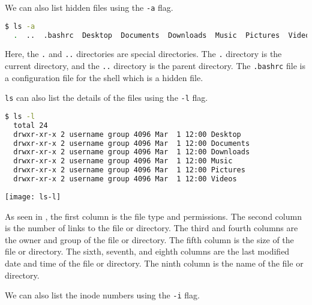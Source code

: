 We can also list hidden files
using the \lstinline|-a| flag.

\begin{lstlisting}[language=bash]
  $ ls -a
  .  ..  .bashrc  Desktop  Documents  Downloads  Music  Pictures  Videos
\end{lstlisting}

Here, the \lstinline|.| and \lstinline|..| directories are special directories. The \lstinline|.| directory is the current directory, and the \lstinline|..| directory is the parent directory.
The \lstinline|.bashrc| file is a configuration file for the shell which is a hidden file.

\lstinline|ls| can also list the details of the files using the \lstinline|-l| flag.

\begin{lstlisting}[language=bash]
  $ ls -l
  total 24
  drwxr-xr-x 2 username group 4096 Mar  1 12:00 Desktop
  drwxr-xr-x 2 username group 4096 Mar  1 12:00 Documents
  drwxr-xr-x 2 username group 4096 Mar  1 12:00 Downloads
  drwxr-xr-x 2 username group 4096 Mar  1 12:00 Music
  drwxr-xr-x 2 username group 4096 Mar  1 12:00 Pictures
  drwxr-xr-x 2 username group 4096 Mar  1 12:00 Videos
\end{lstlisting}

\begin{marginfigure}
	\texttt{[image: ls-l]}
	\caption[\lstinline|ls -l| Output]{\lstinline|ls -l| Output}
\end{marginfigure}

As seen in , the first column is the file type and permissions.
The second column is the number of links to the file or directory.
The third and fourth columns are the owner and group of the file or directory.
The fifth column is the size of the file or directory.
The sixth, seventh, and eighth columns are the last modified date and time of the file or directory.
The ninth column is the name of the file or directory.

We can also list the inode numbers
using the \lstinline|-i| flag.

